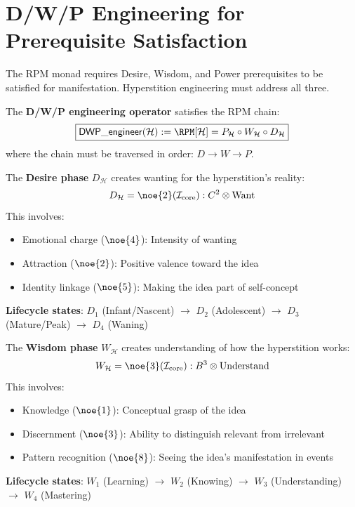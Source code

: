 \section{D/W/P Engineering for Prerequisite Satisfaction}
\label{sec:dwp-engineering}

The RPM monad requires Desire, Wisdom, and Power prerequisites to be satisfied for manifestation. Hyperstition engineering must address all three.

\begin{definition}
\label{def:prerequisite-engineering}
The \textbf{D/W/P engineering operator} satisfies the RPM chain:
\begin{equation}
\boxed{
\mathsf{DWP\_engineer}(\mathcal{H}) := \RPM[\mathcal{H}] = P_\mathcal{H} \circ W_\mathcal{H} \circ D_\mathcal{H}
}
\end{equation}
where the chain must be traversed in order: $D \to W \to P$.
\end{definition}

\begin{definition}
\label{def:desire-engineering}
The \textbf{Desire phase} $D_\mathcal{H}$ creates wanting for the hyperstition's reality:
\[
D_\mathcal{H} = \noe{2}(\mathcal{I}_{\text{core}}) : C^2 \otimes \text{Want}
\]
This involves:
\begin{itemize}
    \item Emotional charge ($\noe{4}$): Intensity of wanting
    \item Attraction ($\noe{2}$): Positive valence toward the idea
    \item Identity linkage ($\noe{5}$): Making the idea part of self-concept
\end{itemize}
\textbf{Lifecycle states}: $D_1$ (Infant/Nascent) $\to$ $D_2$ (Adolescent) $\to$ $D_3$ (Mature/Peak) $\to$ $D_4$ (Waning)
\end{definition}

\begin{definition}
\label{def:wisdom-engineering}
The \textbf{Wisdom phase} $W_\mathcal{H}$ creates understanding of how the hyperstition works:
\[
W_\mathcal{H} = \noe{3}(\mathcal{I}_{\text{core}}) : B^3 \otimes \text{Understand}
\]
This involves:
\begin{itemize}
    \item Knowledge ($\noe{1}$): Conceptual grasp of the idea
    \item Discernment ($\noe{3}$): Ability to distinguish relevant from irrelevant
    \item Pattern recognition ($\noe{8}$): Seeing the idea's manifestation in events
\end{itemize}
\textbf{Lifecycle states}: $W_1$ (Learning) $\to$ $W_2$ (Knowing) $\to$ $W_3$ (Understanding) $\to$ $W_4$ (Mastering)
\end{definition}

